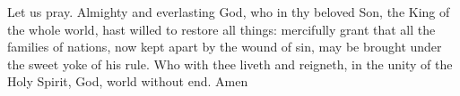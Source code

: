Let us pray.
Almighty and everlasting God, who in thy beloved Son, the King of the whole world, hast willed to restore all things: mercifully grant that all the families of nations, now kept apart by the wound of sin, may be brought under the sweet yoke of his rule.
Who with thee liveth and reigneth, in the unity of the Holy Spirit, God, world without end.  Amen